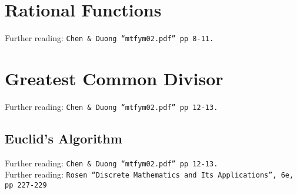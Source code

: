 \section{Rational Functions}
\label{sec:P Rational Functions}
Further reading: \texttt{Chen \& Duong ``mtfym02.pdf'' pp 8-11.}

\section{Greatest Common Divisor}
\label{sec:P Greatest Common Divisor}
Further reading: \texttt{Chen \& Duong ``mtfym02.pdf'' pp 12-13.}

\subsection{Euclid's Algorithm}
\label{sec:P Greatest Common Divisor}
Further reading: \texttt{Chen \& Duong ``mtfym02.pdf'' pp 12-13.}\\
Further reading: \texttt{Rosen ``Discrete Mathematics and Its Applications'', 6e, pp 227-229}